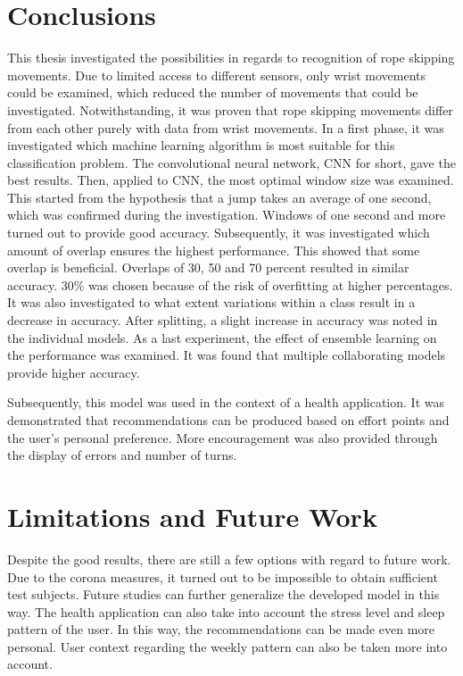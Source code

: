 \documentclass[twocolumn]{phdsymp} %
\begin{document}
\section{Conclusions}
\noindent
This thesis investigated the possibilities in regards to recognition of rope skipping movements. Due to limited access to different sensors, only wrist movements could be examined, which reduced the number of movements that could be investigated.
Notwithstanding, it was proven that rope skipping movements differ from each other purely with data from wrist movements. In a first phase, it was investigated which machine learning algorithm is most suitable for this classification problem. The convolutional neural network, CNN for short, gave the best results. Then, applied to CNN, the most optimal window size was examined. This started from the hypothesis that a jump takes an average of one second, which was confirmed during the investigation. Windows of one second and more turned out to provide good accuracy. Subsequently, it was investigated which amount of overlap ensures the highest performance. This showed that some overlap is beneficial. Overlaps of 30, 50 and 70 percent resulted in similar accuracy. 30\% was chosen because of the risk of overfitting at higher percentages.
It was also investigated to what extent variations within a class result in a decrease in accuracy. After splitting, a slight increase in accuracy was noted in the individual models.
As a last experiment, the effect of ensemble learning on the performance was examined. It was found that multiple collaborating models provide higher accuracy.

Subsequently, this model was used in the context of a health application. It was demonstrated that recommendations can be produced based on effort points and the user's personal preference. More encouragement was also provided through the display of errors and number of turns.

\section{Limitations and Future Work}
Despite the good results, there are still a few options with regard to future work.
Due to the corona measures, it turned out to be impossible to obtain sufficient test subjects. Future studies can further generalize the developed model in this way. The health application can also take into account the stress level and sleep pattern of the user. In this way, the recommendations can be made even more personal. User context regarding the weekly pattern can also be taken more into account.

\nocite{*}



%

\printbibliography
\end{document}
